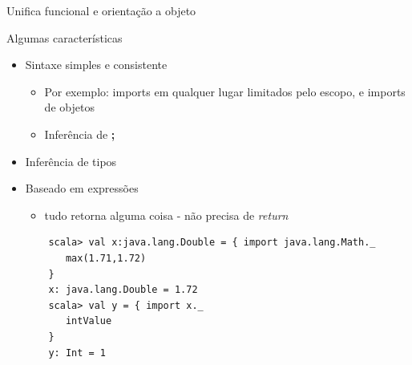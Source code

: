 \documentclass{beamer}
\begin{document}
\begin{frame}{Unifica funcional e orientação a objeto} 
\end{frame}

\begin{frame}[fragile]{Algumas características} 
    \begin{itemize} [<+->]
        \item Sintaxe simples e consistente 
        \begin{itemize}[<1->]
              \item Por exemplo: imports em qualquer lugar limitados pelo escopo, e imports
 de objetos
 	   \item Inferência de \textbf{;} 
        \end{itemize}
        \item Inferência de tipos 
        \item Baseado em expressões
        \begin{itemize}[<3->]
              \item tudo retorna alguma coisa - não precisa de \emph{return}
        \end{itemize}
        \begin{lstlisting}
	scala> val x:java.lang.Double = { import java.lang.Math._
	   max(1.71,1.72) 
	}
	x: java.lang.Double = 1.72	
	scala> val y = { import x._
	   intValue 
	}
	y: Int = 1
	\end{lstlisting}
       
    \end{itemize}
\end{frame}
\end{document}
